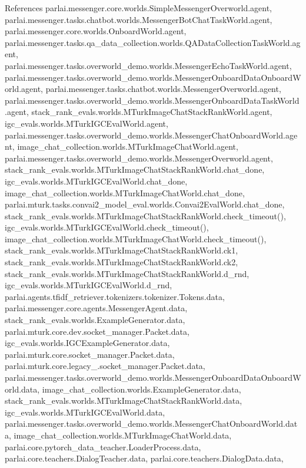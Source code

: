 References parlai.\+messenger.\+core.\+worlds.\+Simple\+Messenger\+Overworld.\+agent, parlai.\+messenger.\+tasks.\+chatbot.\+worlds.\+Messenger\+Bot\+Chat\+Task\+World.\+agent, parlai.\+messenger.\+core.\+worlds.\+Onboard\+World.\+agent, parlai.\+messenger.\+tasks.\+qa\+\_\+data\+\_\+collection.\+worlds.\+Q\+A\+Data\+Collection\+Task\+World.\+agent, parlai.\+messenger.\+tasks.\+overworld\+\_\+demo.\+worlds.\+Messenger\+Echo\+Task\+World.\+agent, parlai.\+messenger.\+tasks.\+overworld\+\_\+demo.\+worlds.\+Messenger\+Onboard\+Data\+Onboard\+World.\+agent, parlai.\+messenger.\+tasks.\+chatbot.\+worlds.\+Messenger\+Overworld.\+agent, parlai.\+messenger.\+tasks.\+overworld\+\_\+demo.\+worlds.\+Messenger\+Onboard\+Data\+Task\+World.\+agent, stack\+\_\+rank\+\_\+evals.\+worlds.\+M\+Turk\+Image\+Chat\+Stack\+Rank\+World.\+agent, igc\+\_\+evals.\+worlds.\+M\+Turk\+I\+G\+C\+Eval\+World.\+agent, parlai.\+messenger.\+tasks.\+overworld\+\_\+demo.\+worlds.\+Messenger\+Chat\+Onboard\+World.\+agent, image\+\_\+chat\+\_\+collection.\+worlds.\+M\+Turk\+Image\+Chat\+World.\+agent, parlai.\+messenger.\+tasks.\+overworld\+\_\+demo.\+worlds.\+Messenger\+Overworld.\+agent, stack\+\_\+rank\+\_\+evals.\+worlds.\+M\+Turk\+Image\+Chat\+Stack\+Rank\+World.\+chat\+\_\+done, igc\+\_\+evals.\+worlds.\+M\+Turk\+I\+G\+C\+Eval\+World.\+chat\+\_\+done, image\+\_\+chat\+\_\+collection.\+worlds.\+M\+Turk\+Image\+Chat\+World.\+chat\+\_\+done, parlai.\+mturk.\+tasks.\+convai2\+\_\+model\+\_\+eval.\+worlds.\+Convai2\+Eval\+World.\+chat\+\_\+done, stack\+\_\+rank\+\_\+evals.\+worlds.\+M\+Turk\+Image\+Chat\+Stack\+Rank\+World.\+check\+\_\+timeout(), igc\+\_\+evals.\+worlds.\+M\+Turk\+I\+G\+C\+Eval\+World.\+check\+\_\+timeout(), image\+\_\+chat\+\_\+collection.\+worlds.\+M\+Turk\+Image\+Chat\+World.\+check\+\_\+timeout(), stack\+\_\+rank\+\_\+evals.\+worlds.\+M\+Turk\+Image\+Chat\+Stack\+Rank\+World.\+ck1, stack\+\_\+rank\+\_\+evals.\+worlds.\+M\+Turk\+Image\+Chat\+Stack\+Rank\+World.\+ck2, stack\+\_\+rank\+\_\+evals.\+worlds.\+M\+Turk\+Image\+Chat\+Stack\+Rank\+World.\+d\+\_\+rnd, igc\+\_\+evals.\+worlds.\+M\+Turk\+I\+G\+C\+Eval\+World.\+d\+\_\+rnd, parlai.\+agents.\+tfidf\+\_\+retriever.\+tokenizers.\+tokenizer.\+Tokens.\+data, parlai.\+messenger.\+core.\+agents.\+Messenger\+Agent.\+data, stack\+\_\+rank\+\_\+evals.\+worlds.\+Example\+Generator.\+data, parlai.\+mturk.\+core.\+dev.\+socket\+\_\+manager.\+Packet.\+data, igc\+\_\+evals.\+worlds.\+I\+G\+C\+Example\+Generator.\+data, parlai.\+mturk.\+core.\+socket\+\_\+manager.\+Packet.\+data, parlai.\+mturk.\+core.\+legacy\+\_.\+socket\+\_\+manager.\+Packet.\+data, parlai.\+messenger.\+tasks.\+overworld\+\_\+demo.\+worlds.\+Messenger\+Onboard\+Data\+Onboard\+World.\+data, image\+\_\+chat\+\_\+collection.\+worlds.\+Example\+Generator.\+data, stack\+\_\+rank\+\_\+evals.\+worlds.\+M\+Turk\+Image\+Chat\+Stack\+Rank\+World.\+data, igc\+\_\+evals.\+worlds.\+M\+Turk\+I\+G\+C\+Eval\+World.\+data, parlai.\+messenger.\+tasks.\+overworld\+\_\+demo.\+worlds.\+Messenger\+Chat\+Onboard\+World.\+data, image\+\_\+chat\+\_\+collection.\+worlds.\+M\+Turk\+Image\+Chat\+World.\+data, parlai.\+core.\+pytorch\+\_\+data\+\_\+teacher.\+Loader\+Process.\+data, parlai.\+core.\+teachers.\+Dialog\+Teacher.\+data, parlai.\+core.\+teachers.\+Dialog\+Data.\+data, 